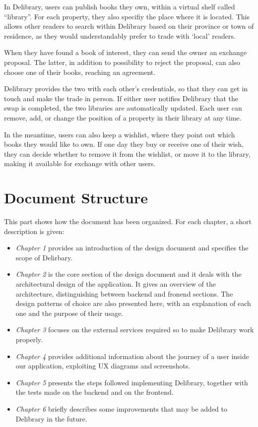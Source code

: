 \clearpage
In Delibrary, users can publish books they own, within a virtual shelf called ``library''.
For each property, they also specifiy the place where it is located. This allows other readers to search within Delibrary based on their province or town of residence,
as they would understandably prefer to trade with `local' readers.

When they have found a book of interest, they can send the owner an exchange proposal. The latter, in addition to possibility to reject the proposal, can also choose one of their books, reaching an agreement.

Delibrary provides the two with each other's credentials, so that they can get in touch and make the trade in person. If either user notifies Delibrary that the swap is completed, the two libraries are automatically updated.
Each user can remove, add, or change the position of a property in their library at any time.

In the meantime, users can also keep a wishlist, where they point out which books they would like to own.
If one day they buy or receive one of their wish, they can decide whether to remove it from the wishlist, or move it to the library, making it available for exchange with other users.

\section{Document Structure}
This part shows how the document has been organized.
For each chapter, a short description is given:
\begin{itemize}
      \item \textit{Chapter 1} provides an introduction of the design document and specifies the scope of Delirbary.
      \item \textit{Chapter 2} is the core section of the design document and it deals with the architectural design of the application.
            It gives an overview of the architecture, distinguishing between backend and fronend sections.
            The design patterns of choice are also presented here, with an explanation of each one and the purpose of their usage.
      \item \textit{Chapter 3} focuses on the external services required so to make Delibrary work properly.
      \item \textit{Chapter 4} provides additional information about the journey of a user inside our application, exploiting UX diagrams and screenshots.
      \item \textit{Chapter 5} presents the steps followed implementing Delibrary, together with the tests made on the backend and on the frontend.
      \item \textit{Chapter 6} briefly describes some improvements that may be added to Delibrary in the future.
\end{itemize}



